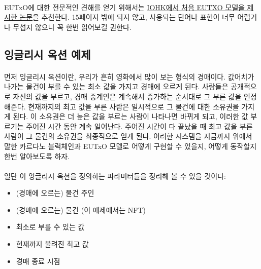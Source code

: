 \documentclass[a4paper, 11pt]{article}
\begin{document}
    \paragraph{} EUTxO에 대한 전문적인 견해를 얻기 위해서는 \href{https://iohk.io/en/research/library/papers/the-extended-utxo-model/}{IOHK에서 처음 EUTXO 모델을 제시한 논문}을 추천한다. 15페이지 밖에 되지 않고, 사용되는 단어나 표현이 너무 어렵거나 무섭지 않으니 꼭 한번 읽어보길 권한다. 
 
    \subsection{잉글리시 옥션 예제}
    
    \paragraph{} 먼저 잉글리시 옥션이란, 우리가 흔히 영화에서 많이 보는 형식의 경매이다. 값어치가 나가는 물건이 부를 수 있는 최소 값을 가지고 경매에 오르게 된다. 사람들은 공개적으로 자신의 값을 부르고, 경매 중계인은 계속해서 증가하는 순서대로 그 부른 값을 인정해준다. 현재까지의 최고 값을 부른 사람은 일시적으로 그 물건에 대한 소유권을 가지게 된다. 이 소유권은 더 높은 값을 부르는 사람이 나타나면 바뀌게 되고, 이러한 값 부르기는 주어진 시간 동안 계속 일어난다. 주어진 시간이 다 끝났을 때 최고 값을 부른 사람이 그 물건의 소유권을 최종적으로 얻게 된다. 이러한 시스템을 지금까지 위에서 말한 카르다노 블럭체인과 EUTxO 모델로 어떻게 구현할 수 있을지, 어떻게 동작할지 한번 알아보도록 하자.

    \paragraph{} 일단 이 잉글리시 옥션을 정의하는 파라미터들을 정리해 볼 수 있을 것이다:
    \begin{itemize}
        \item (경매에 오르는) 물건 주인 
        \item (경매에 오르는) 물건 (이 예제에서는 NFT)
        \item 최소로 부를 수 있는 값
        \item 현재까지 불려진 최고 값
        \item 경매 종료 시점
    \end{itemize}
\end{document}
